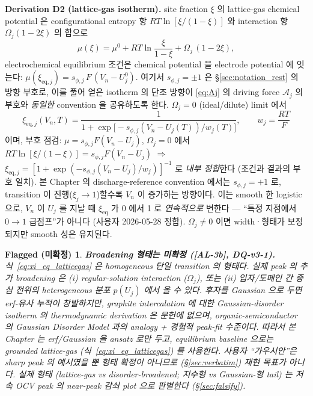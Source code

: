 \documentclass[11pt,a4paper]{article}
\newtheorem*{flagbox}{Flagged (미확정)}
\newcommand{\eq}{\mathrm{eq}}
\newcommand{\AL}[1]{\textsf{[AL-#1]}}
\begin{document}
\textbf{Derivation D2 (lattice-gas isotherm).} site fraction $\xi$ 의 lattice-gas
chemical potential 은 configurational entropy 항 $RT\ln[\xi/(1-\xi)]$ 와 interaction
항 $\Omega_j(1-2\xi)$ 의 합으로
\begin{equation}
\mu(\xi) = \mu^0 + RT\ln\frac{\xi}{1-\xi} + \Omega_j\,(1-2\xi),
\label{eq:mu_latticegas}
\end{equation}
electrochemical equilibrium 조건은 chemical potential 을 electrode potential 에
잇는다: $\mu(\xi_{\eq,j}) = s_{\phi,j}\,F\,(V_n-U_j^0)$. 여기서 $s_{\phi,j}=\pm1$ 은
\S\ref{sec:notation_rest} 의 방향 부호로, 이를 풀어 얻은 isotherm 의 단조 방향이
\eqref{eq:Aj} 의 driving force $\mathcal A_j$ 의 부호와 \emph{동일한} convention 을
공유하도록 한다. $\Omega_j=0$ (ideal/dilute) limit 에서
\begin{equation}
\boxed{\;\xi_{\eq,j}(V_n,T) = \frac{1}{1+\exp\!\big[-s_{\phi,j}(V_n-U_j(T))/w_j(T)\big]},\qquad
w_j=\frac{RT}{F}\;}
\label{eq:xi_eq_latticegas}
\end{equation}
이며, 부호 점검: $\mu=s_{\phi,j}F(V_n-U_j)$, $\Omega_j=0$ 에서 $RT\ln[\xi/(1-\xi)]=
s_{\phi,j}F(V_n-U_j)$ $\Rightarrow$ $\xi_{\eq,j}=[1+\exp(-s_{\phi,j}(V_n-U_j)/w_j)]^{-1}$
로 \emph{내부 정합}한다 (조건과 결과의 부호 일치). 본 Chapter 의 discharge-reference
convention 에서는 $s_{\phi,j}=+1$ 로, transition 이 진행($\xi_j\!\to\!1$)할수록 $V_n$ 이
증가하는 방향이다. 이는 smooth 한 logistic 으로, $V_n$ 이 $U_j$ 를 지날 때 $\xi_\eq$ 가
0 에서 1 로 \emph{연속적으로} 변한다 — ``특정 지점에서 $0\!\to\!1$ 급점프''가 아니다
(사용자 2026-05-28 정합). $\Omega_j\ne0$ 이면 width·형태가 보정되지만 smooth 성은 유지된다.

\begin{flagbox}
\textbf{Broadening 형태는 미확정 (\AL{3b}, DQ-v3-1).} 식~\eqref{eq:xi_eq_latticegas}
은 \emph{homogeneous} 단일 transition 의 형태다. 실제 peak 의 추가 broadening 은 (i)
regular-solution interaction ($\Omega_j$), 또는 (ii) 입자/도메인 간 중심 전위의
\emph{heterogeneous} 분포 $p(U_j)$ 에서 올 수 있다. 후자를 Gaussian 으로 두면 erf-유사
누적이 창발하지만, graphite intercalation 에 대한 \emph{Gaussian-disorder isotherm 의
thermodynamic derivation 은 문헌에 없으며}, organic-semiconductor 의 Gaussian Disorder
Model \cite{basssler1993} 과의 analogy + 경험적 peak-fit 수준이다. 따라서 본 Chapter 는
erf/Gaussian 을 \emph{ansatz} 로만 두고, equilibrium baseline 으로는 grounded
lattice-gas (식~\eqref{eq:xi_eq_latticegas}) 를 사용한다. 사용자 ``가우시안''은 sharp
peak 의 예시였을 뿐 형태 확정이 아니므로 (\S\ref{sec:verbatim}) 재현 목표가 아니다.
실제 형태 (lattice-gas vs disorder-broadened; 지수형 vs Gaussian-형 tail) 는 저속 OCV
peak 의 near-peak 감쇠 plot 으로 판별한다 (\S\ref{sec:falsify}).
\end{flagbox}
\end{document}
